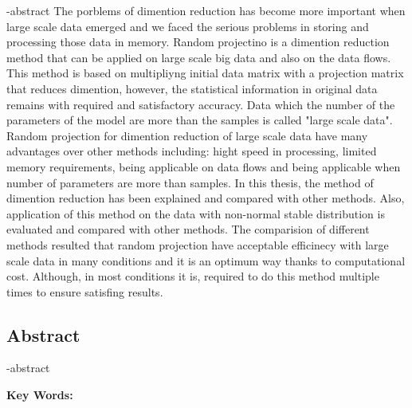 
\en-abstract{
The porblems of dimention reduction has become more important when large scale data emerged and we faced the serious problems
in storing and processing those data in memory.
Random projectino is a dimention reduction method that can be applied on
large scale big data and also on the data flows.
This method is based on multipliyng initial data matrix with a projection matrix that reduces dimention, 
however, the statistical information in original data remains with required and satisfactory accuracy.
Data which the number of the parameters of the model are more than the samples is called "large scale data".
Random projection for dimention reduction of large scale data have many advantages over other methods
including: hight speed in processing, limited memory requirements, being applicable on data flows and being applicable when
number of parameters are more than samples.
In this thesis, the method of dimention reduction has been explained and compared with other methods.
Also, application of this method on the data with non-normal stable distribution is evaluated and compared with other methods.
The comparision of different methods resulted that random projection have acceptable efficinecy with large scale data in many conditions and
it is an optimum way thanks to computational cost.
Although, in most conditions it is, required to do this method multiple times to ensure satisfing results.
}

\newpage
\thispagestyle{empty}
\begin{latin}
\section*{\LARGE\centering Abstract}

\een-abstract

\vspace*{.5cm}
{\large\textbf{Key Words:}}\par
\vspace*{.5cm}
\elatinkeywords
\end{latin}
